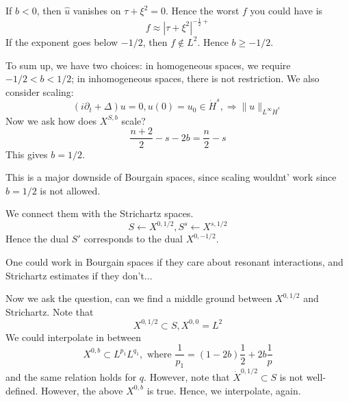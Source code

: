 If $b<0$, then $\widehat{u}$ vanishes on $\tau+\xi^2=0$. Hence the worst $f$ you could have is
\begin{equation*}
    f\approx |\tau+\xi^2|^{-\frac{1}{2}+}
\end{equation*}
If the exponent goes below $-1/2$, then $f\not\in L^2$. Hence $b\geq -1/2$.

To sum up, we have two choices: in homogeneous spaces, we require $-1/2<b<1/2$;  in inhomogeneous spaces, there is not restriction. We also consider scaling:
\begin{equation*}
    (i\partial_t+\Delta)u=0, u(0)=u_0\in\dot{H}^s, \Rightarrow \|u\|_{L^\infty\dot{H}^s}
\end{equation*}
Now we ask how does $X^{S,b}$ scale?
\begin{equation*}
    \frac{n+2}{2}-s-2b=\frac{n}{2}-s
\end{equation*}
This gives $b=1/2$.

\begin{remark}
    This is a major downside of Bourgain spaces, since scaling wouldnt' work since $b=1/2$ is not allowed.
\end{remark}
We connect them with the Strichartz spaces.
\begin{equation*}
    S\leftarrow X^{0,1/2}, S^s\leftarrow X^{s,1/2}
\end{equation*}
Hence the dual $S'$ corresponds to the dual $X^{0,-1/2}$.

\begin{remark}
    One could work in Bourgain spaces if they care about resonant interactions, and Strichartz estimates if they don't...
\end{remark}

Now we ask the question, can we find a middle ground between $X^{0,1/2}$ and Strichartz. Note that 
\begin{equation*}
    X^{0,1/2}\subset S, X^{0,0}=L^2
\end{equation*}
We could interpolate in between
\begin{equation*}
    X^{0,b}\subset L^{p_1}L^{q_1}, \text{ where } \frac{1}{p_1}=(1-2b)\frac{1}{2}+2b\frac{1}{p}
\end{equation*}
and the same relation holds for $q$. However, note that $\dot{X}^{0,1/2}\subset S$ is not well-defined. However, the above $X^{0,b}$ is true. Hence, we interpolate, again.

